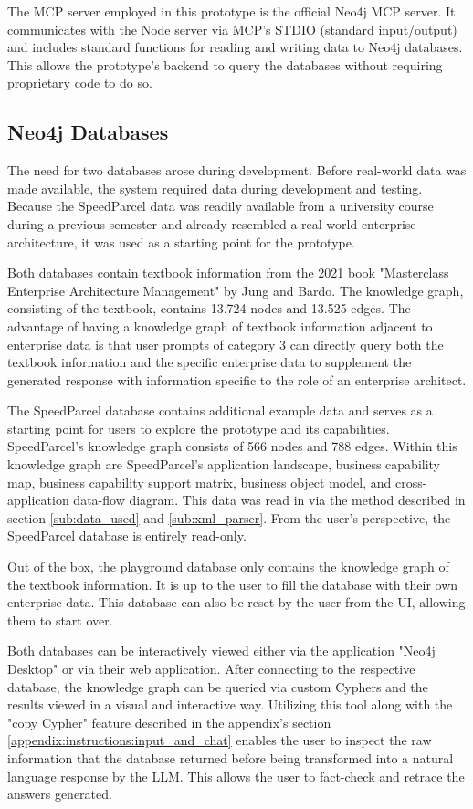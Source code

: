 The MCP server employed in this prototype is the official Neo4j MCP server. It communicates with the Node server via MCP's STDIO (standard input/output) and includes standard functions for reading and writing data to Neo4j databases. \cite{neo4j_mcp_2025} This allows the prototype's backend to query the databases without requiring proprietary code to do so.

\subsection{Neo4j Databases}
\label{sub:datbases}
The need for two databases arose during development. Before real-world data was made available, the system required data during development and testing. Because the SpeedParcel data was readily available from a university course during a previous semester and already resembled a real-world enterprise architecture, it was used as a starting point for the prototype.

Both databases contain textbook information from the 2021 book "Masterclass Enterprise Architecture Management" by Jung and Bardo. \cite{jung2021masterclass} The knowledge graph, consisting of the textbook, contains 13.724 nodes and 13.525 edges. The advantage of having a knowledge graph of textbook information adjacent to enterprise data is that user prompts of category 3 can directly query both the textbook information and the specific enterprise data to supplement the generated response with information specific to the role of an enterprise architect.

The SpeedParcel database contains additional example data and serves as a starting point for users to explore the prototype and its capabilities. SpeedParcel's knowledge graph consists of 566 nodes and 788 edges. Within this knowledge graph are SpeedParcel's application landscape, business capability map, business capability support matrix, business object model, and cross-application data-flow diagram. This data was read in via the method described in section \ref{sub:data_used} and \ref{sub:xml_parser}. From the user's perspective, the SpeedParcel database is entirely read-only.

Out of the box, the playground database only contains the knowledge graph of the textbook information. It is up to the user to fill the database with their own enterprise data. This database can also be reset by the user from the UI, allowing them to start over.

Both databases can be interactively viewed either via the application "Neo4j Desktop" or via their web application. After connecting to the respective database, the knowledge graph can be queried via custom Cyphers and the results viewed in a visual and interactive way. Utilizing this tool along with the "copy Cypher" feature described in the appendix's section \ref{appendix:instructions:input_and_chat} enables the user to inspect the raw information that the database returned before being transformed into a natural language response by the LLM. This allows the user to fact-check and retrace the answers generated.


